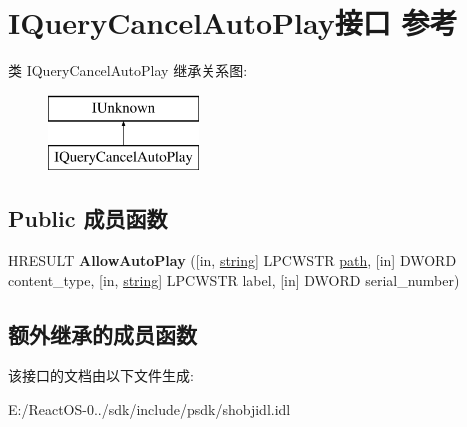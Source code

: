 \hypertarget{interface_i_query_cancel_auto_play}{}\section{I\+Query\+Cancel\+Auto\+Play接口 参考}
\label{interface_i_query_cancel_auto_play}
类 I\+Query\+Cancel\+Auto\+Play 继承关系图\+:\begin{figure}[H]
\begin{center}
\leavevmode
\includegraphics[height=2.000000cm]{interface_i_query_cancel_auto_play}
\end{center}
\end{figure}
\subsection*{Public 成员函数}
\begin{DoxyCompactItemize}
\item 
\mbox{\label{interface_i_query_cancel_auto_play_a5d920beb4a95261377f12c4174f4c357}} 
H\+R\+E\+S\+U\+LT {\bfseries Allow\+Auto\+Play} (\mbox{[}in, \hyperlink{structstring}{string}\mbox{]} L\+P\+C\+W\+S\+TR \hyperlink{structpath}{path}, \mbox{[}in\mbox{]} D\+W\+O\+RD content\+\_\+type, \mbox{[}in, \hyperlink{structstring}{string}\mbox{]} L\+P\+C\+W\+S\+TR label, \mbox{[}in\mbox{]} D\+W\+O\+RD serial\+\_\+number)
\end{DoxyCompactItemize}
\subsection*{额外继承的成员函数}


该接口的文档由以下文件生成\+:\begin{DoxyCompactItemize}
\item 
E\+:/\+React\+O\+S-\/0../sdk/include/psdk/shobjidl.\+idl\end{DoxyCompactItemize}
